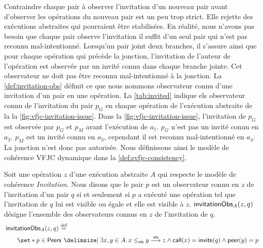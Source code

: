 Contraindre chaque pair à observer l'invitation d'un nouveau pair avant d'observer les opérations du nouveau pair est un peu trop strict.
Elle rejette des exécutions abstraites qui pourraient être stabilisées.
En réalité, nous n'avons pas besoin que chaque pair observe l'invitation il suffit d'un seul pair qui n'est pas reconnu mal-intentionné.
Lorsqu'un pair joint deux branches, il s'assure ainsi que pour chaque opération qui précède la jonction, l'invitation de l'auteur de l'opération est observée par un invité connu dans chaque branche jointe.
Cet observateur ne doit pas être reconnu mal-intentionné à la jonction.
La \autoref{def:invitation-obs} définit ce que nous nommons observateur connu d'une invitation d'un pair en une opération.
La \autoref{tab:invited} indique els observateur connu de l'invitation du pair $p_G$ en chaque opération de l'exécution abstraite de la la \autoref{fig:vfjc-invitation-issue}.
Dans la \autoref{fig:vfjc-invitation-issue}, l'invitation de $p_G$ est observée par $p_G$ et $p_M$ avant l'exécution de $a_1$.
$p_G$ n'est pas un invité connu en $a_3$.
$p_M$ est un invité connu en $a_3$, cependant il est reconnu mal-intentionné en $a_4$.
La jonction n'est donc pas autorisée.
Nous définissons ainsi le modèle de cohérence \ac{VFJC} dynamique dans la \autoref{def:svfjc-consistency}.

\begin{definition}\label{def:invitation-obs}
Soit une opération $z$ d'une exécution abstraite $A$ qui respecte le modèle de cohérence \emph{Invitation}.
Nous disons que le pair $p$ est un observateur connu en $z$ de l'invitation d'un pair $q$ si et seulement si $p$ a exécuté une opération tel que l'invitation de $q$ lui est visible ou égale et elle est visible à $z$.
$\operatorname{\mathsf{invitationObs}}_A(z, q)$ désigne l'ensemble des observateurs connus en $z$ de l'invitation de $q$.
\begin{equation*}\begin{split}
    \MoveEqLeft\trm{invitationObs}_A(z, q) \defeq\\
    &\set*{p \in \trm{Peers} \given \exists x, y \in A \qsep x \viseq y \vis z \land \trm{call}(x) = \trm{invite}(q) \land \trm{peer}(y) = p}
\end{split}\end{equation*}
\end{definition}

